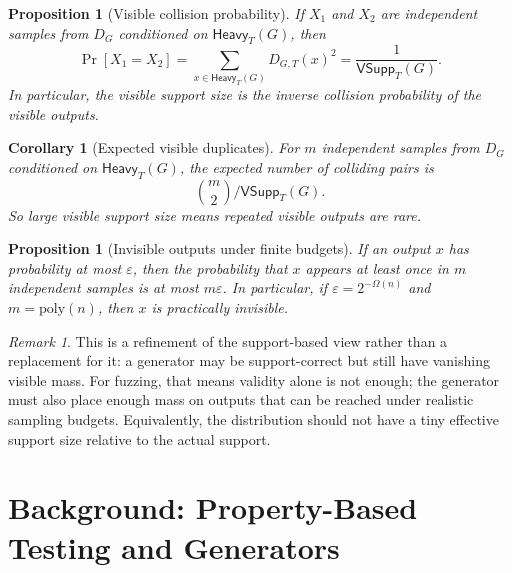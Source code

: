 \documentclass[11pt]{article}
\newtheorem{proposition}[definition]{Proposition}
\newtheorem{corollary}[definition]{Corollary}
\theoremstyle{remark}
\newtheorem{remark}[definition]{Remark}
\theoremstyle{definition}
\begin{document}
\begin{proposition}[Visible collision probability]
If $X_1$ and $X_2$ are independent samples from $D_G$ conditioned on $\mathsf{Heavy}_T(G)$, then
\[
\Pr[X_1 = X_2] = \sum_{x \in \mathsf{Heavy}_T(G)} D_{G,T}(x)^2 = \frac{1}{\mathsf{VSupp}_T(G)}.
\]
In particular, the visible support size is the inverse collision probability of the visible outputs.
\end{proposition}

\begin{corollary}[Expected visible duplicates]
For $m$ independent samples from $D_G$ conditioned on $\mathsf{Heavy}_T(G)$, the expected number of colliding pairs is
\[
\binom{m}{2} / \mathsf{VSupp}_T(G).
\]
So large visible support size means repeated visible outputs are rare.
\end{corollary}

\begin{proposition}[Invisible outputs under finite budgets]
If an output $x$ has probability at most $\varepsilon$, then the probability that $x$ appears at least once in $m$ independent samples is at most $m\varepsilon$.
In particular, if $\varepsilon = 2^{-\Omega(n)}$ and $m = \mathrm{poly}(n)$, then $x$ is practically invisible.
\end{proposition}

\begin{remark}
This is a refinement of the support-based view rather than a replacement for it: a generator may be support-correct but still have vanishing visible mass. For fuzzing, that means validity alone is not enough; the generator must also place enough mass on outputs that can be reached under realistic sampling budgets. Equivalently, the distribution should not have a tiny effective support size relative to the actual support.
\end{remark}



\section{Background: Property-Based Testing and Generators}\label{sec:pbt-background}
\end{document}
